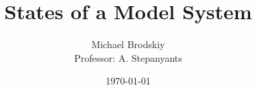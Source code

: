 


\title{States of a Model System}
\date{\today}
\author{Michael Brodskiy\\ \small Professor: A. Stepanyants}



\maketitle

